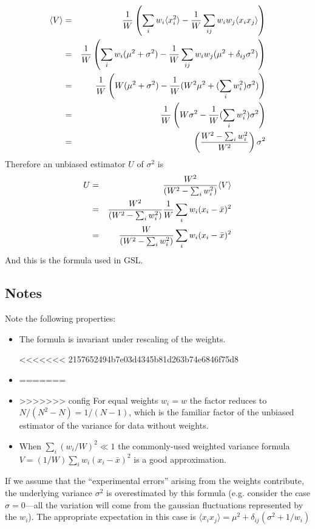 \documentclass[fleqn,12pt]{article}
\newcommand{\expectation}[1]{\langle #1 \rangle}
\begin{document}
%
\begin{eqnarray}
\expectation{V}   &=& {1\over W} \left( \sum_i w_i \expectation{x_i^2}
       - {1 \over W} \sum_{ij} w_i w_j \expectation{x_i x_j}\right)\\
      &=& {1\over W} \left( \sum_i w_i (\mu^2 + \sigma^2)
       - {1 \over W} \sum_{ij} w_i w_j (\mu^2 + \delta_{ij} \sigma^2)\right)\\
      &=& {1\over W} \left( W (\mu^2 + \sigma^2)
       - {1 \over W} ( W^2 \mu^2 +( \sum_i w_i^2) \sigma^2)\right)\\
      &=& {1\over W} \left(W \sigma^2 - {1 \over W} ( \sum_i w_i^2)\sigma^2\right)\\
      &=& \left({{W^2 - \sum_i w_i^2} \over W^2}\right) \sigma^2
\end{eqnarray}
%
Therefore an unbiased estimator $U$ of $\sigma^2$ is
%
\begin{eqnarray}
U &=& {W^2 \over {(W^2 - \sum_i w_i^2)}} \expectation{V}\\
  &=& {W^2 \over {(W^2 - \sum_i w_i^2)}} {1\over W} \sum_i w_i (x_i - \bar{x})^2 \\
  &=& {W \over {(W^2 - \sum_i w_i^2)}} \sum_i w_i (x_i - \bar{x})^2
\end{eqnarray}
%
And this is the formula used in GSL.
\subsection{Notes}
Note the following properties:

\begin{itemize}
\item
The formula is invariant under rescaling of the weights.

<<<<<<< 2157652494b7e03d4345b81d263b74e6846f75d8
\item 
=======
\item
>>>>>>> config
For equal weights $w_i = w$ the factor reduces to $N/(N^2-N) =
1/(N-1)$, which is the familiar factor of the unbiased estimator of
the variance for data without weights.

\item
When $\sum_i (w_i/W)^2 \ll 1$ the commonly-used weighted variance
formula $V = (1/W)\sum_i w_i (x_i - \bar{x})^2$ is a good
approximation.
\end{itemize}

If we assume that the ``experimental errors'' arising from the weights
contribute, the underlying variance $\sigma^2$ is overestimated by
this formula (e.g. consider the case $\sigma = 0$---all the variation
will come from the gaussian fluctuations represented by the
$w_i$). The appropriate expectation in this case is $\expectation{x_i
  x_j} = \mu^2 + \delta_{ij} (\sigma^2 + 1/w_i)$
\end{document}
